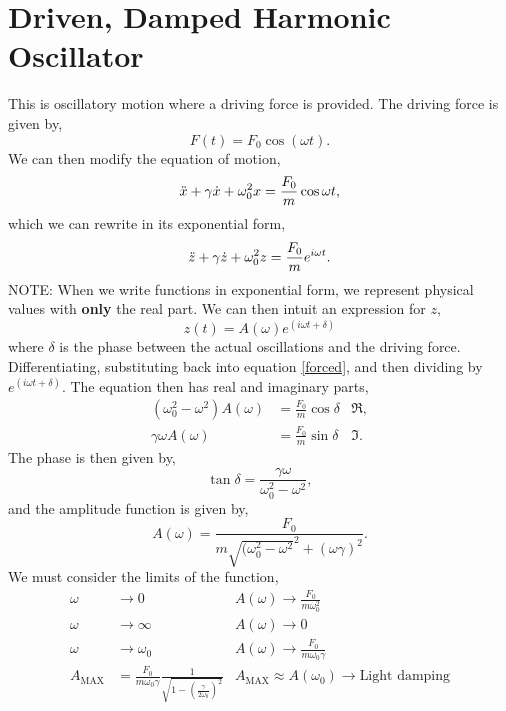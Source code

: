 \documentclass{book}
\begin{document}
\chapter{Driven, Damped Harmonic Oscillator}
This is oscillatory motion where a driving force is provided. The driving force is given by,
\begin{equation}
    F(t) = F_0\cos(\omega t).
\end{equation}
We can then modify the equation of motion,
\begin{equation}
    \Ddot{x} + \gamma\Dot{x} + \omega_0^2 x = \frac{F_0}{m}\cos{\omega t},
\end{equation}
which we can rewrite in its exponential form,
\begin{equation} \label{forced}
    \Ddot{z} + \gamma\Dot{z} + \omega_0^2z = \frac{F_0}{m}e^{i\omega t}.
\end{equation}
NOTE: When we write functions in exponential form, we represent physical values with \textbf{only} the real part. We can then intuit an expression for $z$,
\begin{equation}
    z(t) = A(\omega)e^{(i\omega t  + \delta)}
\end{equation}
where $\delta$ is the phase between the actual oscillations and the driving force. Differentiating, substituting back into equation \eqref{forced}, and then dividing by $e^{(i\omega t + \delta)}$. The equation then has real and imaginary parts,
\begin{align}
    (\omega_0^2 - \omega^2)A(\omega) &= \frac{F_0}{m}\cos\delta & \Re, \\
    \gamma \omega A(\omega) &= \frac{F_0}{m}\sin\delta & \Im.
\end{align}
The phase is then given by,
\begin{equation}
    \tan \delta = \frac{\gamma \omega}{\omega_0^2 - \omega^2},
\end{equation}
and the amplitude function is given by,
\begin{equation}
    A(\omega) = \frac{F_0}{m\sqrt{(\omega_0^2 - \omega^2}^2 + (\omega\gamma)^2}.
\end{equation}
We must consider the limits of the function,
\begin{align}
    \omega &\to 0 & A(\omega) \to \frac{F_0}{m\omega_0^2} \\
    \omega &\to \infty & A(\omega) \to 0 \\
    \omega &\to \omega_0 & A(\omega) \to \frac{F_0}{m\omega_0\gamma} \\
    A_{\text{MAX}}&=\frac{F_0}{m\omega_0\gamma}\frac{1}{\sqrt{1-\left(\frac{\gamma}{2\omega_0}\right)^2}} & A_{\text{MAX}} \approx A(\omega_0) \to \text{Light damping}
\end{align}
\end{document}
